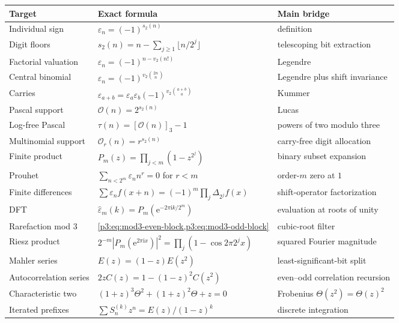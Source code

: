 \documentclass[11pt,oneside]{article}
\theoremstyle{definition}
\theoremstyle{remark}
\newcommand{\e}{\mathrm e}
\newcommand{\ii}{\mathrm i}
\newcommand{\vtwo}{v_2}
\newcommand{\bitsum}{s_2}
\newcommand{\eps}{\varepsilon}
\begin{document}
\begin{longtable}{>{\raggedright\arraybackslash}p{}
                  >{\raggedright\arraybackslash}p{}
                  >{\raggedright\arraybackslash}p{}}
\toprule
Target & Exact formula & Main bridge \\
\midrule
\endhead
Individual sign & $\eps_n=(-1)^{\bitsum(n)}$ & definition \\
Digit floors & $\bitsum(n)=n-\sum_{j\ge1}\lfloor n/2^j\rfloor$ & telescoping bit extraction \\
Factorial valuation & $\eps_n=(-1)^{n-\vtwo(n!)}$ & Legendre \\
Central binomial & $\eps_n=(-1)^{\vtwo\binom{2n}{n}}$ & Legendre plus shift invariance \\
Carries & $\eps_{a+b}=\eps_a\eps_b(-1)^{\vtwo\binom{a+b}{a}}$ & Kummer \\
Pascal support & $\mathcal O(n)=2^{\bitsum(n)}$ & Lucas \\
Log-free Pascal & $\tau(n)=[\mathcal O(n)]_3-1$ & powers of two modulo three \\
Multinomial support & $\mathcal O_r(n)=r^{\bitsum(n)}$ & carry-free digit allocation \\
Finite product & $P_m(z)=\prod_{j<m}(1-z^{2^j})$ & binary subset expansion \\
Prouhet & $\sum_{n<2^m}\eps_nn^r=0$ for $r<m$ & order-$m$ zero at $1$ \\
Finite differences & $\sum\eps_nf(x+n)=(-1)^m\prod_j\Delta_{2^j}f(x)$ & shift-operator factorization \\
DFT & $\widehat\eps_m(k)=P_m(\e^{-2\pi\ii k/2^m})$ & evaluation at roots of unity \\
Rarefaction mod $3$ & \cref{p3:eq:mod3-even-block,p3:eq:mod3-odd-block} & cubic-root filter \\
Riesz product & $2^{-m}|P_m(\e^{2\pi\ii x})|^2=\prod_j(1-\cos2\pi2^jx)$ & squared Fourier magnitude \\
Mahler series & $E(z)=(1-z)E(z^2)$ & least-significant-bit split \\
Autocorrelation series & $2zC(z)=1-(1-z)^2C(z^2)$ & even--odd correlation recursion \\
Characteristic two & $(1+z)^3\Theta^2+(1+z)^2\Theta+z=0$ & Frobenius $\Theta(z^2)=\Theta(z)^2$ \\
Iterated prefixes & $\sum S_n^{(k)}z^n=E(z)/(1-z)^k$ & discrete integration \\
\bottomrule
\end{longtable}
\end{document}
